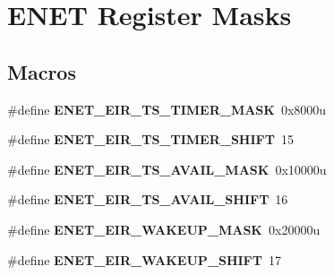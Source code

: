 \hypertarget{group___e_n_e_t___register___masks}{}\section{E\+N\+E\+T Register Masks}
\label{group___e_n_e_t___register___masks}
\subsection*{Macros}
\begin{DoxyCompactItemize}
\item 
\hypertarget{group___e_n_e_t___register___masks_gabded92ce4206647b27b1107db2bb5088}{}\#define {\bfseries E\+N\+E\+T\+\_\+\+E\+I\+R\+\_\+\+T\+S\+\_\+\+T\+I\+M\+E\+R\+\_\+\+M\+A\+S\+K}~0x8000u\label{group___e_n_e_t___register___masks_gabded92ce4206647b27b1107db2bb5088}

\item 
\hypertarget{group___e_n_e_t___register___masks_ga40800c9bb4d99721c93e7d7031f96300}{}\#define {\bfseries E\+N\+E\+T\+\_\+\+E\+I\+R\+\_\+\+T\+S\+\_\+\+T\+I\+M\+E\+R\+\_\+\+S\+H\+I\+F\+T}~15\label{group___e_n_e_t___register___masks_ga40800c9bb4d99721c93e7d7031f96300}

\item 
\hypertarget{group___e_n_e_t___register___masks_gae746d0a643c9d6e39e07623a1d944acc}{}\#define {\bfseries E\+N\+E\+T\+\_\+\+E\+I\+R\+\_\+\+T\+S\+\_\+\+A\+V\+A\+I\+L\+\_\+\+M\+A\+S\+K}~0x10000u\label{group___e_n_e_t___register___masks_gae746d0a643c9d6e39e07623a1d944acc}

\item 
\hypertarget{group___e_n_e_t___register___masks_gad811839fe8168bdb1e55007a785d132b}{}\#define {\bfseries E\+N\+E\+T\+\_\+\+E\+I\+R\+\_\+\+T\+S\+\_\+\+A\+V\+A\+I\+L\+\_\+\+S\+H\+I\+F\+T}~16\label{group___e_n_e_t___register___masks_gad811839fe8168bdb1e55007a785d132b}

\item 
\hypertarget{group___e_n_e_t___register___masks_ga0fbd5b05a2c5421000b0a2aa1ee1565a}{}\#define {\bfseries E\+N\+E\+T\+\_\+\+E\+I\+R\+\_\+\+W\+A\+K\+E\+U\+P\+\_\+\+M\+A\+S\+K}~0x20000u\label{group___e_n_e_t___register___masks_ga0fbd5b05a2c5421000b0a2aa1ee1565a}

\item 
\hypertarget{group___e_n_e_t___register___masks_gaca3f3ef47646913b04686a282364408d}{}\#define {\bfseries E\+N\+E\+T\+\_\+\+E\+I\+R\+\_\+\+W\+A\+K\+E\+U\+P\+\_\+\+S\+H\+I\+F\+T}~17\label{group___e_n_e_t___register___masks_gaca3f3ef47646913b04686a282364408d}


\end{DoxyCompactItemize}

